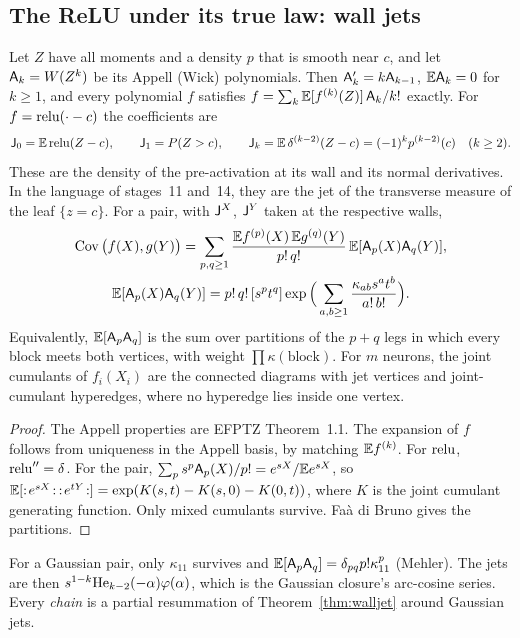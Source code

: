 \subsection{The ReLU under its true law: wall jets}
\begin{theorem}\label{thm:walljet}
Let $Z$ have all moments and a density $p$ that is smooth near $c$, and let $\mathsf A_k=W(Z^k)$ be its Appell (Wick) polynomials. Then
$\mathsf A_k'=k\mathsf A_{k-1}$, $\mathbb E\mathsf A_k=0$ for $k\ge1$, and every polynomial $f$ satisfies $f=\sum_k\mathbb E[f^{(k)}(Z)]\,\mathsf A_k/k!$ exactly. For
$f=\operatorname{relu}(\cdot-c)$ the coefficients are
\[
\mathsf J_0=\mathbb E\operatorname{relu}(Z-c),\qquad \mathsf J_1=P(Z>c),\qquad \mathsf J_k=\mathbb E\,\delta^{(k-2)}(Z-c)=(-1)^kp^{(k-2)}(c)\quad(k\ge2).
\]
These are the density of the pre-activation at its wall and its normal derivatives. In the language of stages~11 and~14, they are the
jet of the transverse measure of the leaf $\{z=c\}$. For a pair, with $\mathsf J^X$, $\mathsf J^Y$ taken at the respective walls,
\begin{gather*}
\operatorname{Cov}\big(f(X),g(Y)\big)=\sum_{p,q\ge1}\frac{\mathbb E f^{(p)}(X)\,\mathbb E g^{(q)}(Y)}{p!\,q!}\,\mathbb E[\mathsf A_p(X)\mathsf A_q(Y)],\\
\mathbb E[\mathsf A_p(X)\mathsf A_q(Y)]=p!\,q!\,[s^pt^q]\exp\Big(\sum_{a,b\ge1}\frac{\kappa_{ab}s^at^b}{a!\,b!}\Big).
\end{gather*}
Equivalently, $\mathbb E[\mathsf A_p\mathsf A_q]$ is the sum over partitions of the $p+q$ legs in which every block meets both vertices, with weight
$\prod\kappa(\text{block})$. For $m$ neurons, the joint cumulants of $f_i(X_i)$ are the connected diagrams with jet vertices and joint-cumulant
hyperedges, where no hyperedge lies inside one vertex.
\end{theorem}
\begin{proof}
The Appell properties are EFPTZ Theorem~1.1. The expansion of $f$ follows from uniqueness in the Appell basis, by matching
$\mathbb E f^{(k)}$. For $\operatorname{relu}$, $\operatorname{relu}''=\delta$. For the pair, $\sum_p s^p\mathsf A_p(X)/p!=e^{sX}/\mathbb E e^{sX}$, so $\mathbb E[:\!e^{sX}\!:\,:\!e^{tY}\!:]=\exp(K(s,t)-K(s,0)-K(0,t))$,
where $K$ is the joint cumulant generating function. Only mixed cumulants survive. Faà di Bruno gives the partitions.
\end{proof}
For a Gaussian pair, only $\kappa_{11}$ survives and $\mathbb E[\mathsf A_p\mathsf A_q]=\delta_{pq}p!\kappa_{11}^p$ (Mehler). The jets are then
$s^{1-k}\mathrm{He}_{k-2}(-\alpha)\varphi(\alpha)$, which is the Gaussian closure's arc-cosine series. Every \emph{chain} is a partial
resummation of Theorem~\ref{thm:walljet} around Gaussian jets.

